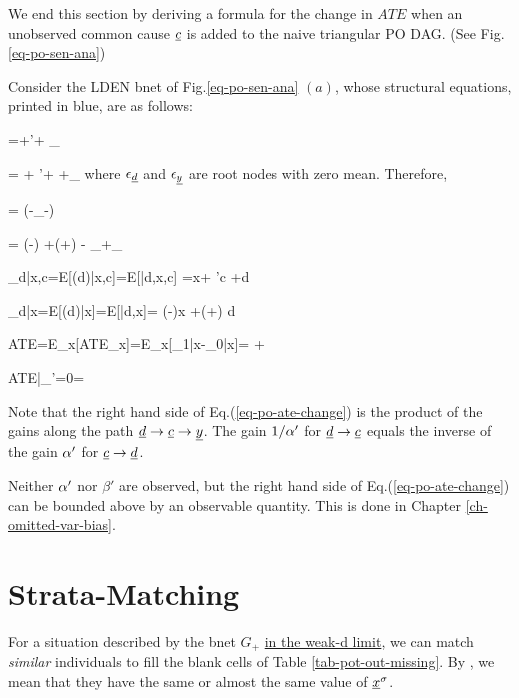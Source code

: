 We end this section by 
deriving a formula
for the change in $ATE$
when an unobserved
common cause $\rvc$ is added to the 
naive triangular PO DAG.
(See Fig.\ref{eq-po-sen-ana})


Consider the LDEN bnet of Fig.\ref{eq-po-sen-ana} $(a)$,
whose structural equations,
printed in blue, are as follows:


\beq\color{blue}
\rvd=\alp\rvx +\alp'\rvc + \eps_\rvd
\eeq

\beq\color{blue}
\rvy = \beta \rvx + \beta'\rvc + \delta \rvd
+\eps_\rvy
\eeq
where $\eps_\rvd$ and $\eps_\rvy$
are root nodes with zero mean.
Therefore,

\beq
\rvc = (\rvd-\eps_\rvd -\alp\rvx)
\eeq

\beq
\rvy = \left(\beta-\;\right)\rvx
+\left(\delta+\right)
\rvd-
\eps_\rvd +\eps_\rvy
\eeq


\beq
\caly_{d|x,c}=E[\rvy(d)|x,c]=E[\rvy|d,x,c]
=\beta x+ \beta'c +\delta d
\eeq

\beq
\caly_{d|x}=E[\rvy(d)|x]=E[\rvy|d,x]=
\left(\beta-\;\right)x
+\left(\delta+\right)
d
\eeq



\beq
ATE=E_x[ATE_x]=E_x[\caly_{1|x}-\caly_{0|x}]=
\delta+
\eeq

\beq
ATE|_{\beta'=0}=\delta
\eeq

\beq
{}
\label{eq-po-ate-change}
\eeq
Note that the right hand side 
of Eq.(\ref{eq-po-ate-change})
is the product of the gains
along the path $\rvd\rarrow \rvc\rarrow\rvy$.
The gain 
$1/\alpha'$ for $\rvd\rarrow\rvc$  
equals 
the inverse of the gain 
$\alpha'$ for $\rvc\rarrow\rvd$.

Neither $\alpha'$ nor $\beta'$
are observed, but the right hand side
of Eq.(\ref{eq-po-ate-change})
can be bounded above by
an observable quantity.
This is done in Chapter \ref{ch-omitted-var-bias}.




\section{Strata-Matching}
\label{sec-strata-matching}

For a situation
described by
the bnet $G_{+}$
\ul{ in the weak-d limit},
we can match {\it similar}
individuals to fill the blank cells of
 Table \ref{tab-pot-out-missing}.
By , we mean that
they have the same or almost the same
value of $\rvx^\s$.

